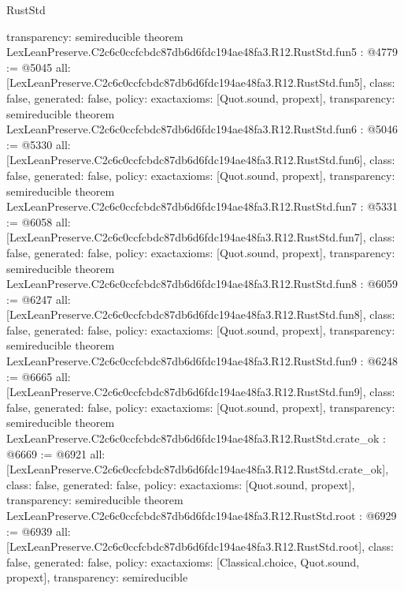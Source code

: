 \begin{lexlean}{RustStd}
\begin{coremodule}
{  transparency: semireducible
}
theorem LexLeanPreserve.C2c6c0ccfcbdc87db6d6fdc194ae48fa3.R12.RustStd.fun5 : @4779 := @5045 {
  all: [LexLeanPreserve.C2c6c0ccfcbdc87db6d6fdc194ae48fa3.R12.RustStd.fun5],
  class: false,
  generated: false,
  policy: exact{axioms: [Quot.sound, propext]},
  transparency: semireducible
}
theorem LexLeanPreserve.C2c6c0ccfcbdc87db6d6fdc194ae48fa3.R12.RustStd.fun6 : @5046 := @5330 {
  all: [LexLeanPreserve.C2c6c0ccfcbdc87db6d6fdc194ae48fa3.R12.RustStd.fun6],
  class: false,
  generated: false,
  policy: exact{axioms: [Quot.sound, propext]},
  transparency: semireducible
}
theorem LexLeanPreserve.C2c6c0ccfcbdc87db6d6fdc194ae48fa3.R12.RustStd.fun7 : @5331 := @6058 {
  all: [LexLeanPreserve.C2c6c0ccfcbdc87db6d6fdc194ae48fa3.R12.RustStd.fun7],
  class: false,
  generated: false,
  policy: exact{axioms: [Quot.sound, propext]},
  transparency: semireducible
}
theorem LexLeanPreserve.C2c6c0ccfcbdc87db6d6fdc194ae48fa3.R12.RustStd.fun8 : @6059 := @6247 {
  all: [LexLeanPreserve.C2c6c0ccfcbdc87db6d6fdc194ae48fa3.R12.RustStd.fun8],
  class: false,
  generated: false,
  policy: exact{axioms: [Quot.sound, propext]},
  transparency: semireducible
}
theorem LexLeanPreserve.C2c6c0ccfcbdc87db6d6fdc194ae48fa3.R12.RustStd.fun9 : @6248 := @6665 {
  all: [LexLeanPreserve.C2c6c0ccfcbdc87db6d6fdc194ae48fa3.R12.RustStd.fun9],
  class: false,
  generated: false,
  policy: exact{axioms: [Quot.sound, propext]},
  transparency: semireducible
}
theorem LexLeanPreserve.C2c6c0ccfcbdc87db6d6fdc194ae48fa3.R12.RustStd.crate_ok : @6669 := @6921 {
  all: [LexLeanPreserve.C2c6c0ccfcbdc87db6d6fdc194ae48fa3.R12.RustStd.crate_ok],
  class: false,
  generated: false,
  policy: exact{axioms: [Quot.sound, propext]},
  transparency: semireducible
}
theorem LexLeanPreserve.C2c6c0ccfcbdc87db6d6fdc194ae48fa3.R12.RustStd.root : @6929 := @6939 {
  all: [LexLeanPreserve.C2c6c0ccfcbdc87db6d6fdc194ae48fa3.R12.RustStd.root],
  class: false,
  generated: false,
  policy: exact{axioms: [Classical.choice, Quot.sound, propext]},
  transparency: semireducible
}


\end{coremodule}
\end{lexlean}
